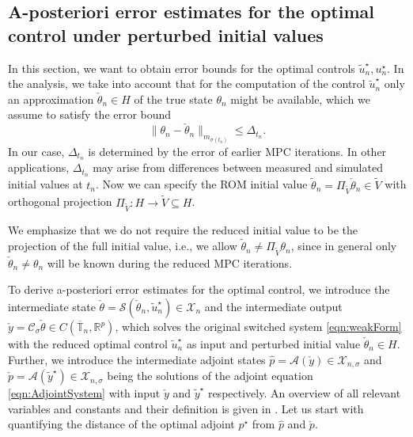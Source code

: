 \documentclass[reqno]{amsart}
\newcommand*\closure[1]{\overline{#1}}
\newcommand{\X}{{\mathscr X}}
\newcommand{\R}{\mathbb R}
\newcommand{\timeInt}{\mathbb{T}}
\newcommand{\state}{\theta}
\newcommand{\adState}{p}
\newcommand{\inpVar}{u}
\newcommand{\outVar}{y}
\newcommand{\cOper}{\calC}
\newcommand{\solper}{\calS}
\newcommand{\solA}{\mathcal{A}}
\newcommand{\initBound}{\initBoundn{n}}%
\newcommand{\initBoundn}[1]{\Delta_{t_{#1}}}
\newcommand{\intermediateInitState}{\intermediateState_n}%
\newcommand{\optAdState}{\adState^\star}
\newcommand{\optInpVar}[1]{\inpVar_{#1}^\star}
\newcommand{\optInpVarN}{\optInpVar{n}}
\newcommand{\switch}{\sigma}
\newcommand{\reduce}[1]{\tilde{#1}}
\newcommand{\Vred}{\reduce{V}}
\newcommand{\projVred}{\Pi_{\Vred}}
\newcommand{\stateRed}{\reduce{\state}}
\newcommand{\outVarRed}{\reduce{\outVar}}
\newcommand{\optInpVarRed}[1]{\reduce{\inpVar}_{#1}^\star}
\newcommand{\optInpVarRedN}{\optInpVarRed{n}}
\newcommand{\optOutVarRed}{\outVarRed^\star}
\newcommand{\intermediateState}{\check{\state}}
\newcommand{\intermediateAdStateA}{{\hat \adState}}
\newcommand{\intermediateAdStateB}{\check{\adState}}
\newcommand{\intermediateOutVar}{\check{\outVar}}
\newcommand{\calA}{\mathcal{A}}
\newcommand{\calC}{\mathcal{C}}
\newcommand{\calS}{\mathcal{S}}
\newcommand{\abbr}[1]{\textsf{#1}\xspace}
\newcommand{\ROM}{\abbr{ROM}}
\newcommand{\MPC}{\abbr{MPC}}
\begin{document}
\subsection{A-posteriori error estimates for the optimal control under perturbed initial values}
\label{subsec:optimalcontrolapost}
%
In this section, we want to obtain error bounds for the optimal controls $\optInpVarRedN, \optInpVarN$. In the analysis, we take into account that for the computation of the control $\optInpVarRedN$ only an approximation $\intermediateInitState\in H$ of the true state $\state_n$ might be available, which we assume to satisfy the error bound
%
\begin{equation}\label{eqn:stateInitEst}
    \|\state_n-\intermediateInitState\|_{m_{\switch(t_n)}}\leq \initBound. 
\end{equation}
%
In our case, $\initBound$ is determined by the error of earlier \MPC iterations. In other applications, $\initBound$ may arise from differences between measured and simulated initial values at $t_n$. Now we can specify the \ROM initial value $\stateRed_n= \projVred\intermediateInitState\in\Vred$ with orthogonal projection $\projVred\colon H \to \Vred\subseteq H$. 
\begin{remark}
    We emphasize that we do not require the reduced initial value to be the projection of the full initial value, i.e., we allow $\stateRed_n \neq \projVred \state_n$, since in general only $\intermediateState_n\neq \state_n$ will be known during the reduced \MPC iterations.        
\end{remark}
%
To derive a-posteriori error estimates for the optimal control, we introduce the intermediate state $\intermediateState=\solper(\intermediateInitState,\optInpVarRedN) \in \X_n$  and the intermediate output $\intermediateOutVar=\cOper_\switch\intermediateState\in C(\closure{\timeInt}_n,\R^p)$, which solves the original switched system \eqref{eqn:weakForm} with the reduced optimal control $\optInpVarRedN$ as input and perturbed initial value $\intermediateInitState\in H$.
%
Further, we introduce the intermediate adjoint states $\intermediateAdStateA=\solA(\intermediateOutVar)\in \X_{n,\sigma}$ and $\intermediateAdStateB=\calA(\optOutVarRed)\in \X_{n,\sigma}$ being the solutions of the adjoint equation \eqref{eqn:AdjointSystem} with input $\intermediateOutVar$ and $\optOutVarRed$ respectively.
%
An overview of all relevant variables and constants and their definition is given in . Let us start with quantifying the distance of the optimal adjoint $\optAdState$ from $\intermediateAdStateA$ and $\intermediateAdStateB$. 
\end{document}

